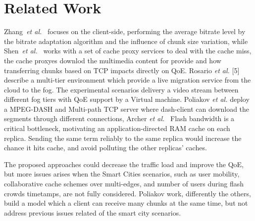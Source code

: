 \section*{Related Work}
\label{sec:releated-work}

Zhang~\textit{et al.}~\cite{zhangINFOCOM17} focuses on the client-side, performing the average bitrate level by the bitrate adaptation algorithm and the influence of chunk size variation, while Shen~\textit{et al.}~\cite{shenIWQoS19} works with a set of cache proxy services to deal with the cache miss, the cache proxyes downlod the multimedia content for provide and how transferring chunks based on TCP impacts directly on QoE. Rosario \textit{et al.} [5] describe a multi-tier environment which provide a live migration service from the cloud to the fog. The experimental scenarios delivery a video stream between different fog tiers with QoE support by a Virtual machine.
Poliakov \textit{et al.} deploy a MPEG-DASH and Multi-path TCP server where dash-client can download the segments through different connections, 
Archer \textit{et al.}~\cite{archerGoogleJournal2019} Flash bandwidth is a critical bottleneck, motivating an application-directed RAM cache on each replica. Sending the same term reliably to the same replica would increase the chance it hits cache, and avoid polluting the other replicas’ caches.

The proposed approaches could decrease the traffic load and improve the QoE, but more issues arises when the Smart Cities scenarios, such as user mobility, collaborative cache schemes over multi-edges, and number of users during flash crowds timetamps, are not fully considered. Poliakov work, differently the others, build a model which a client can receive many chunks at the same time, but not address previous issues related of the smart city scenarios.




